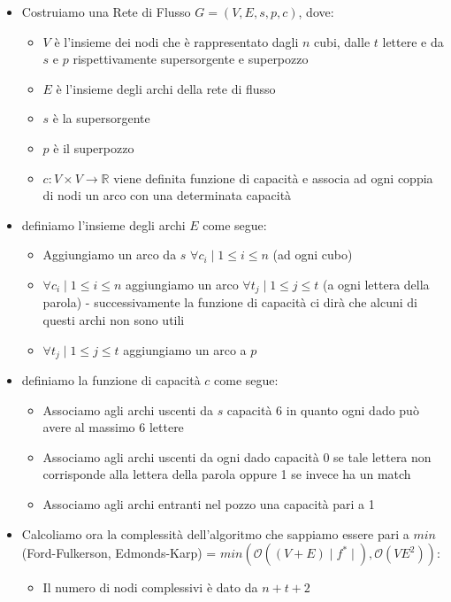 \documentclass[../cheatSheetAlgoritmi.tex]{subfiles}
\begin{document}
\begin{itemize}
	\item Costruiamo una Rete di Flusso $G = (V, E, s, p, c)$, dove:
	\begin{itemize}
		\item $V$ è l'insieme dei nodi che è rappresentato dagli $n$ cubi, dalle $t$ lettere e da $s$ e $p$ rispettivamente supersorgente e superpozzo
		\item $E$ è l'insieme degli archi della rete di flusso
		\item $s$ è la supersorgente
		\item $p$ è il superpozzo
		\item $c: V \times V \rightarrow \mathbb{R}$  viene definita funzione di capacità e associa ad ogni coppia di nodi un arco con una determinata capacità
	\end{itemize}
	\item definiamo l'insieme degli archi $E$ come segue:
		\begin{itemize}
			\item Aggiungiamo un arco da $s$ $\forall c_{i} \mid 1 \leq i \leq n$ (ad ogni cubo)
			\item $\forall c_{i} \mid 1 \leq i \leq n$ aggiungiamo un arco $\forall t_{j} \mid 1 \leq j \leq t$ (a ogni lettera della parola) - successivamente la funzione di capacità ci dirà che alcuni di questi archi non sono utili
			\item $\forall t_{j} \mid 1 \leq j \leq t$ aggiungiamo un arco a $p$
		\end{itemize}
	\item definiamo la funzione di capacità $c$ come segue:
	\begin{itemize}
		\item Associamo agli archi uscenti da $s$ capacità $6$ in quanto ogni dado può avere al massimo 6 lettere
		\item Associamo agli archi uscenti da ogni dado capacità 0 se tale lettera non corrisponde alla lettera della parola oppure 1 se invece ha un match
		\item Associamo agli archi entranti nel pozzo una capacità pari a 1 
	\end{itemize}
	\item Calcoliamo ora la complessità dell'algoritmo che sappiamo essere pari a $min$(Ford-Fulkerson, Edmonds-Karp) = $min(\mathcal{O}((V + E) \mid f^{*} \mid), \mathcal{O}(VE^{2}))$:
		\begin{itemize}
			\item Il numero di nodi complessivi è dato da $n + t +2$

\end{itemize}
\end{itemize}
\end{document}
